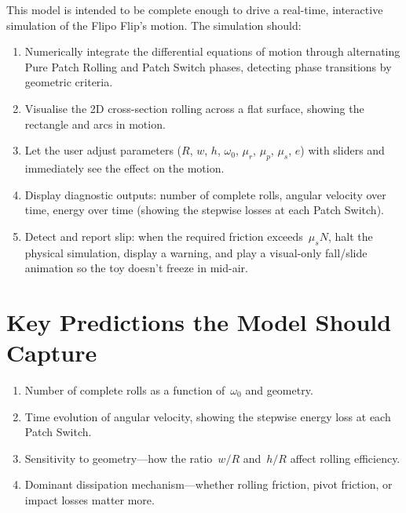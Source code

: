 \documentclass[11pt,a4paper]{article}
\begin{document}
This model is intended to be complete enough to drive a real-time, interactive simulation
of the Flipo Flip's motion.  The simulation should:

\begin{enumerate}
  \item Numerically integrate the differential equations of motion through alternating
        Pure Patch Rolling and Patch Switch phases, detecting phase transitions by
        geometric criteria.
  \item Visualise the 2D cross-section rolling across a flat surface, showing the rectangle
        and arcs in motion.
  \item Let the user adjust parameters ($R$, $w$, $h$, $\omega_0$, $\mu_r$, $\mu_p$,
        $\mu_s$, $e$) with sliders and immediately see the effect on the motion.
  \item Display diagnostic outputs: number of complete rolls, angular velocity over time,
        energy over time (showing the stepwise losses at each Patch Switch).
  \item Detect and report slip: when the required friction exceeds~$\mu_s N$, halt the
        physical simulation, display a warning, and play a visual-only fall/slide animation
        so the toy doesn't freeze in mid-air.
\end{enumerate}

\section{Key Predictions the Model Should Capture}

\begin{enumerate}
  \item Number of complete rolls as a function of~$\omega_0$ and geometry.
  \item Time evolution of angular velocity, showing the stepwise energy loss at each
        Patch Switch.
  \item Sensitivity to geometry---how the ratio~$w/R$ and~$h/R$ affect rolling efficiency.
  \item Dominant dissipation mechanism---whether rolling friction, pivot friction, or
        impact losses matter more.
\end{enumerate}
\end{document}
